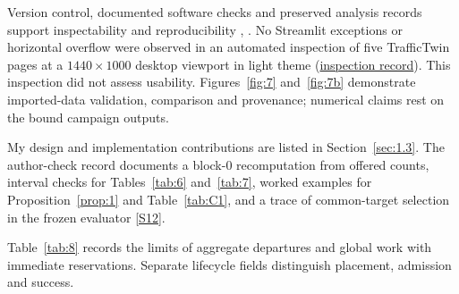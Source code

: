 \documentclass[12pt,a4paper]{article}
\begin{document}
Version control, documented software checks and preserved analysis records support inspectability and reproducibility \cite{ref37}, \cite{ref38}. No Streamlit exceptions or horizontal overflow were observed in an automated inspection of five TrafficTwin pages at a $1440 \times 1000$ desktop viewport in light theme (\href{\detokenize{evidence/product_capture/ui/accessibility-audit.json}}{inspection record}). This inspection did not assess usability. Figures~\ref{fig:7} and~\ref{fig:7b} demonstrate imported-data validation, comparison and provenance; numerical claims rest on the bound campaign outputs.


My design and implementation contributions are listed in Section~\ref{sec:1.3}. The author-check record documents a block-0 recomputation from offered counts, interval checks for Tables~\ref{tab:6} and~\ref{tab:7}, worked examples for Proposition~\ref{prop:1} and Table~\ref{tab:C1}, and a trace of common-target selection in the frozen evaluator \hyperref[source-s12]{[S12]}.

Table~\ref{tab:8} records the limits of aggregate departures and global work with immediate reservations. Separate lifecycle fields distinguish placement, admission and success.
\end{document}

